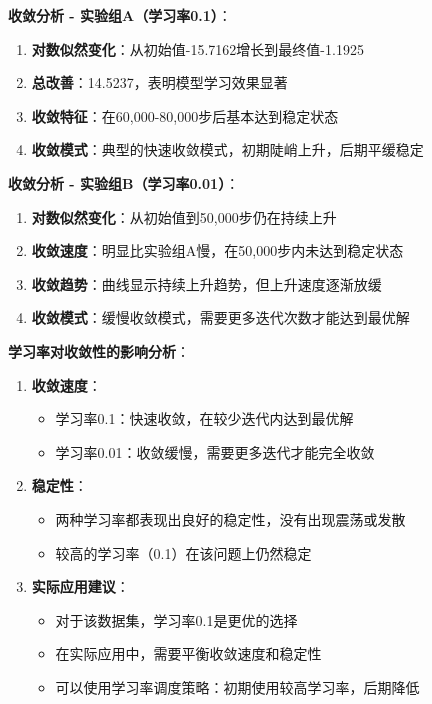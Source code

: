 \documentclass[a4paper]{article}
\begin{document}
\textbf{收敛分析 - 实验组A（学习率0.1）}：
\begin{enumerate}
    \item \textbf{对数似然变化}：从初始值-15.7162增长到最终值-1.1925
    \item \textbf{总改善}：14.5237，表明模型学习效果显著
    \item \textbf{收敛特征}：在60,000-80,000步后基本达到稳定状态
    \item \textbf{收敛模式}：典型的快速收敛模式，初期陡峭上升，后期平缓稳定
\end{enumerate}

\textbf{收敛分析 - 实验组B（学习率0.01）}：
\begin{enumerate}
    \item \textbf{对数似然变化}：从初始值到50,000步仍在持续上升
    \item \textbf{收敛速度}：明显比实验组A慢，在50,000步内未达到稳定状态
    \item \textbf{收敛趋势}：曲线显示持续上升趋势，但上升速度逐渐放缓
    \item \textbf{收敛模式}：缓慢收敛模式，需要更多迭代次数才能达到最优解
\end{enumerate}

\textbf{学习率对收敛性的影响分析}：

\begin{enumerate}
    \item \textbf{收敛速度}：
    \begin{itemize}
        \item 学习率0.1：快速收敛，在较少迭代内达到最优解
        \item 学习率0.01：收敛缓慢，需要更多迭代才能完全收敛
    \end{itemize}
    
    \item \textbf{稳定性}：
    \begin{itemize}
        \item 两种学习率都表现出良好的稳定性，没有出现震荡或发散
        \item 较高的学习率（0.1）在该问题上仍然稳定
    \end{itemize}
    
    \item \textbf{实际应用建议}：
    \begin{itemize}
        \item 对于该数据集，学习率0.1是更优的选择
        \item 在实际应用中，需要平衡收敛速度和稳定性
        \item 可以使用学习率调度策略：初期使用较高学习率，后期降低
    \end{itemize}
\end{enumerate}
\end{document}
